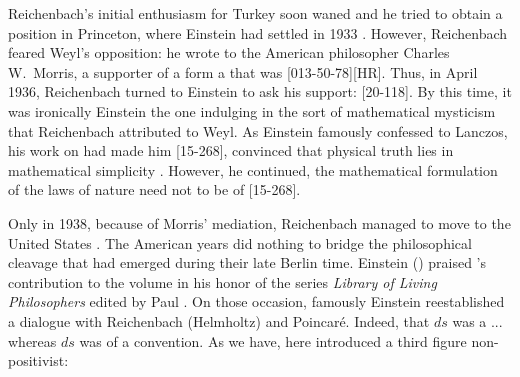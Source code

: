 \documentclass[draft]{article}
\begin{document}
Reichenbach's initial enthusiasm for Turkey soon waned and he tried to obtain a position in Princeton, where Einstein had settled in 1933 \citep{Verhaegh2020a}. However, Reichenbach feared Weyl's opposition:  he wrote to the American philosopher Charles W.\ Morris, a supporter of a form a  that was  [013-50-78][HR]. Thus, in April 1936, Reichenbach turned to Einstein to ask his support:  [20-118]. By this time, it was ironically Einstein the one indulging in the sort of mathematical mysticism that Reichenbach attributed to Weyl. As Einstein famously confessed to Lanczos, his work on \gr had made him  [15-268], convinced that physical truth lies in mathematical simplicity \citep{Ryckman2014}. However, he continued, the mathematical formulation of the laws of nature need not to be of  [15-268]. 


Only in 1938, because of Morris' mediation, Reichenbach managed to move to the United States \citep{Verhaegh2020a}. The American years did nothing to bridge the philosophical cleavage that had emerged during their late Berlin time. Einstein (\citeyear*{Einstein1949f,Einstein1949a}) praised ’s contribution to the volume in his honor of the series \textit{Library of Living Philosophers} edited by Paul \citet{Schilpp1949}. On those occasion, famously Einstein reestablished a dialogue with Reichenbach (Helmholtz) and Poincaré. Indeed, that $ds$ was a ... whereas $ds$ was of a convention. As we have, here introduced a third figure non-positivist:
\end{document}
